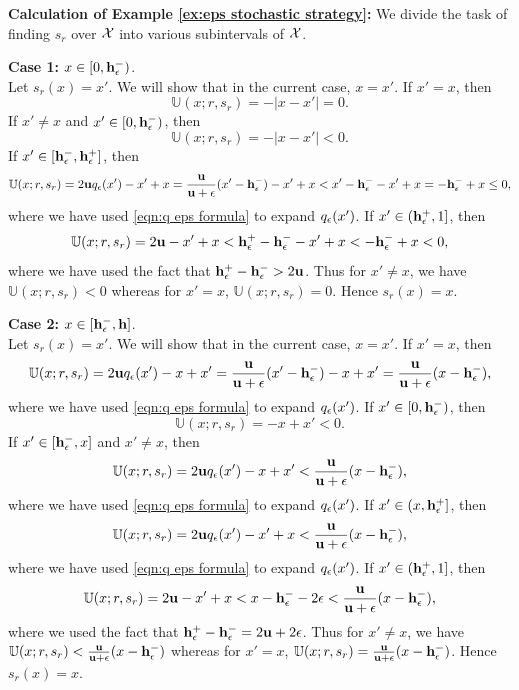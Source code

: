 \noindent \textbf{Calculation of Example \ref{ex:eps stochastic strategy}:} \label{cal:eps stochastic strategy}
 We divide the task of finding $ s_r $ over $ \mathcal{X} $ into various subintervals of $ \mathcal{X} $.

\noindent \textbf{Case 1:} $ x \in [0,\mathbf{h}_{\epsilon}^-) $.\\
    Let $s_r(x) = x'$. We will show that in the current case, $x=x'$.   
    If $x' = x$, then $$\mathbb{U}(x;r,s_r) = -|x-x'| = 0.$$ 
    If $x' \neq x$ and $x' \in [0,\mathbf{h}_{\epsilon}^-)$, then $$\mathbb{U}(x;r,s_r) = -|x-x'| < 0.$$
    If $x' \in [\mathbf{h}_{\epsilon}^-,\mathbf{h}_{\epsilon}^+]$, then $$\mathbb{U}(x;r,s_r) = 2\mathbf{u} q_{\epsilon}(x') - x' + x = \frac{\mathbf{u}}{\mathbf{u} + \epsilon}(x' - \mathbf{h}_{\epsilon}^-) - x' + x < x' - \mathbf{h}_{\epsilon}^- -x' + x = -\mathbf{h}_{\epsilon}^- + x \leq 0,$$ where we have used \eqref{eqn:q eps formula} to expand $q_{\epsilon}(x')$.
    If $x' \in (\mathbf{h}_{\epsilon}^+,1]$, then $$\mathbb{U}(x;r,s_r) = 2\mathbf{u} - x' + x < \mathbf{h}_{\epsilon}^+ - \mathbf{h}_{\epsilon}^- - x' + x < -\mathbf{h}_{\epsilon}^-  + x < 0,$$ where we have used the fact that $\mathbf{h}_{\epsilon}^+ - \mathbf{h}_{\epsilon}^- > 2\mathbf{u}$.
Thus for $x' \neq x$, we have $\mathbb{U}(x;r,s_r) < 0$ whereas for $x' = x$, $\mathbb{U}(x;r,s_r) = 0$. Hence $s_r(x) = x$. 
        


\noindent \textbf{Case 2:} $ x \in [\mathbf{h}_{\epsilon}^-,\mathbf{h}] $.\\
Let $s_r(x) = x'$. We will show that in the current case, $x=x'$. If $x'=x$, then 
\[\mathbb{U}(x;r,s_r) = 2\mathbf{u} q_{\epsilon}(x') - x + x' = \frac{\mathbf{u}}{\mathbf{u}+\epsilon}(x'-\mathbf{h}_{\epsilon}^-) -x +x' = \frac{\mathbf{u}}{\mathbf{u}+\epsilon}(x-\mathbf{h}_{\epsilon}^-),\] where we have used \eqref{eqn:q eps formula} to expand $q_{\epsilon}(x')$.    
If $x' \in [0,\mathbf{h}_{\epsilon}^-)$, then 
\[\mathbb{U}(x;r,s_r) = -x + x' < 0.\]
If $x' \in [\mathbf{h}_{\epsilon}^-,x]$ and $x' \neq x$, then
\[\mathbb{U}(x;r,s_r) = 2\mathbf{u} q_{\epsilon}(x') - x + x' <\frac{\mathbf{u}}{\mathbf{u} + \epsilon}(x- \mathbf{h}_{\epsilon}^-),\] where we have used \eqref{eqn:q eps formula} to expand $q_{\epsilon}(x')$.    
If $x' \in (x,\mathbf{h}_{\epsilon}^+]$, then
\[\mathbb{U}(x;r,s_r) = 2\mathbf{u} q_{\epsilon}(x') - x' + x <  \frac{\mathbf{u}}{\mathbf{u} + \epsilon}(x-\mathbf{h}_{\epsilon}^-),\] where we have used \eqref{eqn:q eps formula} to expand $q_{\epsilon}(x')$. If $x' \in (\mathbf{h}_{\epsilon}^+,1]$, then 
\[\mathbb{U}(x;r,s_r) = 2\mathbf{u} - x' + x < x - \mathbf{h}_{\epsilon}^- - 2\epsilon < \frac{\mathbf{u}}{\mathbf{u}+\epsilon}(x-\mathbf{h}_{\epsilon}^-),\] where we used the fact that $\mathbf{h}_{\epsilon}^+ - \mathbf{h}_{\epsilon}^- =  2\mathbf{u} + 2\epsilon$. 
Thus for $x' \neq x$, we have $\mathbb{U}(x;r,s_r) < \frac{\mathbf{u}}{\mathbf{u}+\epsilon}(x-\mathbf{h}_{\epsilon}^-)$ whereas for $x' = x$, $\mathbb{U}(x;r,s_r) =\frac{\mathbf{u}}{\mathbf{u}+\epsilon}(x - \mathbf{h}_{\epsilon}^-)$. Hence $s_r(x) = x$.



